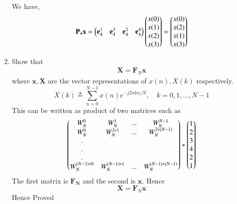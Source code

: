 \documentclass[journal,12pt,twocolumn]{IEEEtran}
\let\vec\mathbf
\renewcommand\thesection{\arabic{section}}
\begin{document}
\begin{enumerate}[label=\thesection.\arabic*]
\begin{align}
    \end{align}
\solution We have,
\begin{align}
	\vec{P}_4\vec{x} = \myvec{\vec{e}_4^1 & \vec{e}_4^3 & \vec{e}_4^2 & \vec{e}_4^4}\myvec{x(0)\\x(1)\\x(2)\\x(3)} = \myvec{x(0)\\x(2)\\x(1)\\x(3)}
	\label{eq:x-permute}
\end{align}
\item Show that 
    \begin{align}
	    \vec{X} = \vec{F}_N \vec{x}
	    \label{eq:dft-mat-def}
    \end{align}
		where $\vec{x}, \vec{X}$ are the vector representations of $x(n), X(k)$ respectively.
	\\\solution
		\begin{equation}
			X(k) \triangleq \sum_{n=0}^{N-1} x(n) e^{-j 2 \pi k n / N}, \quad k=0,1, \ldots, N-1
		\end{equation}
		This can be written as product of two matrices such as
		\begin{equation}
			\begin{pmatrix}
				W^{0}_{N} & W^{1}_{N} & ...& W^{N-1}_{N}\\
				W^{0}_{N} & W^{2*1}_{N} & ...& W^{2*(N-1)}_{N}\\
				.\\
				.\\
				.\\
				W^{(N-1)*0}_{N} & W^{(N-1)*1}_{N} & ...& W^{(N-1)*(N-1)}_{N}\\
			\end{pmatrix}
			*
			\begin{pmatrix}
			1 \\ 2 \\ 3 \\ 4 \\ 2 \\ 1
			\end{pmatrix}
		\end{equation}
		The first matrix is $\vec{F_{N}}$ and the second is $\vec{x}$.
		Hence
		\begin{equation}
			\vec{X} = \vec{F}_N \vec{x}
		\end{equation}
		Hence Proved


\end{enumerate}
\end{document}
